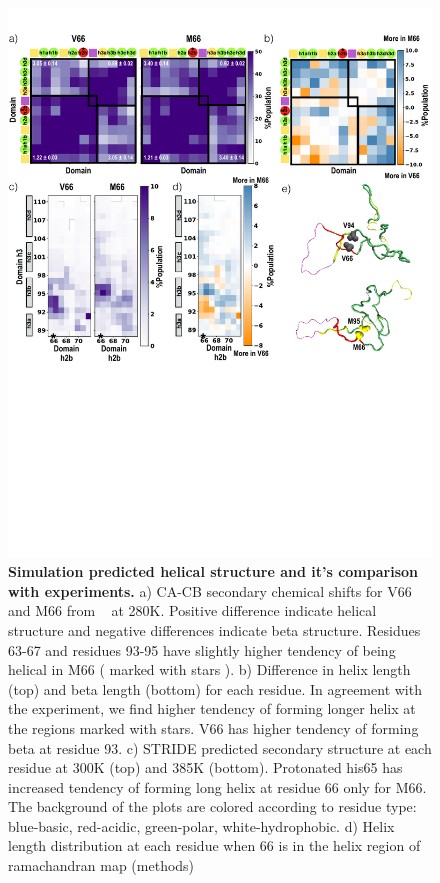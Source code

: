 \documentclass[10pt,letterpaper]{article}
\begin{document}
\begin{figure}[!ht]
\includegraphics[scale=0.5,width=\textwidth,trim={0 0cm 0 0cm},clip]{../figures/fig4.pdf}

\caption{{\bf Simulation predicted helical structure and it's comparison with experiments.}
a) CA-CB secondary chemical shifts for V66 and M66 from  ~\cite{Anastasia2013}  at 280K. Positive difference indicate helical structure and negative differences indicate beta structure. Residues 63-67 and residues 93-95 have slightly higher tendency of being helical in M66 ( marked with stars ). b) Difference in helix length (top) and beta length (bottom) for each residue. In agreement with the experiment, we find higher tendency of forming longer helix at the regions marked with stars. V66 has higher tendency of forming beta at residue 93. c) STRIDE predicted secondary structure at each residue at 300K (top) and 385K (bottom).  Protonated his65 has increased tendency of forming long helix at residue 66 only for M66. The background of the plots are colored according to residue type: blue-basic, red-acidic, green-polar, white-hydrophobic. d) Helix length distribution at each residue when 66 is in the helix region of ramachandran map (methods) }

\label{fig4} 
\end{figure}
\end{document}
